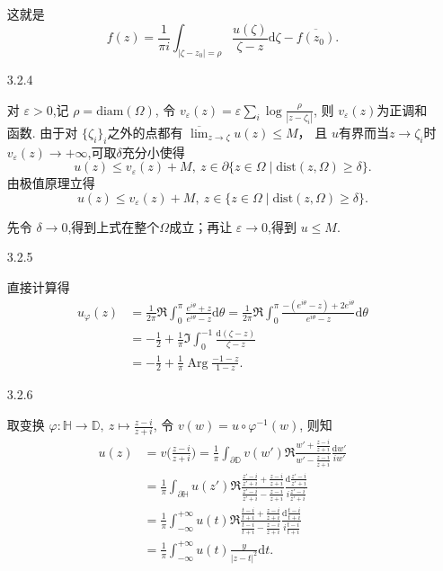 \begin{itemize}
 这就是
 $$f(z) = \frac{1}{\pi i}\int_{|\zeta-z_0|=\rho}
 \frac{u(\zeta)}{\zeta-z}\mathrm{d}\zeta  -\overline{f(z_0)}. $$


    \item[3.2.4]
 
 对  $\varepsilon>0$,记 $\rho = \text{diam}(\Omega)$, 
 令 $v_\varepsilon(z) = \varepsilon\sum_{i} \log\frac{\rho}{|z-\zeta_i|}$, 
 则 $v_\varepsilon(z)$为正调和函数. 
 由于对 $\{\zeta_i\}_i$之外的点都有 $\overline{\lim}_{z \to \zeta} u(z)\le M$，
 且 $u$有界而当$z\to\zeta_i$时$v_\varepsilon(z)\to+\infty$,可取$\delta$充分小使得
 $$u(z)\le v_\varepsilon(z)+M,
 \ z \in \partial\{z \in \Omega\mid \text{dist}(z,\Omega)\ge \delta\}.$$
由极值原理立得
$$u(z)\le v_\varepsilon(z)+M,
\ z \in \{z \in \Omega\mid \text{dist}(z,\Omega)\ge \delta\}.$$

先令 $\delta\to 0$,得到上式在整个$\Omega$成立；再让 $\varepsilon\to 0$,得到 $u\le M$.

    \item[3.2.5]

直接计算得
 \begin{align*}
    u_\varphi(z) &= \frac{1}{2\pi}\Re\int_{0}^{\pi}
    \frac{e^{i\theta}+z}{e^{i\theta}-z}\mathrm{d}\theta 
    = \frac{1}{2\pi} \Re\int_0^{\pi}\frac{-(e^{i\theta}-z)
    +2e^{i\theta}}{e^{i\theta}-z}\mathrm{d}\theta\\
    & = -\frac{1}{2} +\frac{1}{\pi}\Im\int_0^{-1} \frac{\mathrm{d}(\zeta-z)}{\zeta-z}\\
    & = -\frac{1}{2}+ \frac{1}{\pi}\operatorname{Arg}\frac{-1-z}{1-z}.
 \end{align*}


    \item[3.2.6]

取变换 $\varphi : \mathbb{H} \to \mathbb{D},\   z \mapsto \frac{z-i}{z+i}$, 
令 $v(w) = u\circ\varphi^{-1}(w) $,  则知
 \begin{align*}
    u(z) &= v\Big(\frac{z-i}{z+i}\Big) 
    = \frac{1}{\pi}\int_{\partial \mathbb{D}}v(w')
    \Re \frac{w'+\frac{z-i}{z+i}}{w'-\frac{z-i}{z+i}}\frac{\mathrm{d}w'}{iw'}\\
    & =\frac{1}{\pi}\int_{\partial \mathbb{H}}u(z')
    \Re \frac{\frac{z'-i}{z'+i}+\frac{z-i}{z+i}}{\frac{z'-i}{z'+i}-\frac{z-i}{z+i}}
    \frac{\mathrm{d}\frac{z'-i}{z'+i}}{i\frac{z'-i}{z'+i}}\\
    & = \frac{1}{\pi}\int_{-\infty}^{+\infty}u(t)
    \Re \frac{\frac{t-i}{t+i}+\frac{z-i}{z+i}}{\frac{t-i}{t+i}-\frac{z-i}{z+i}}
    \frac{\mathrm{d}\frac{t-i}{t+i}}{i\frac{t-i}{t+i}}\\
    & = \frac{1}{\pi}\int_{-\infty}^{+\infty}u(t)\frac{y}{|z-t|^2}\mathrm{d}t.\\
 \end{align*}



\end{itemize}

